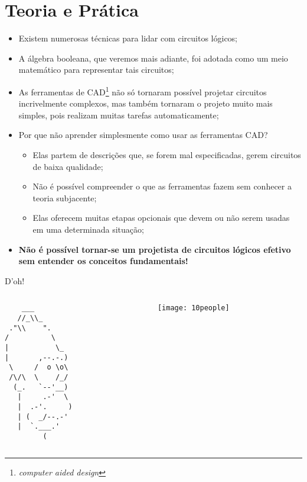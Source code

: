\section{Teoria e Prática}

\begin{frame}{\insertsection}
    \begin{itemize}
        \item Existem numerosas técnicas para lidar com circuitos lógicos; 
        \item A álgebra booleana, que veremos mais adiante, foi adotada como um meio matemático para representar tais circuitos; 
        \item As ferramentas de CAD\footnote{\textit{computer aided design}} não só tornaram possível projetar circuitos incrivelmente complexos, mas também tornaram o projeto muito mais simples, pois realizam muitas tarefas automaticamente;
    \end{itemize}
\end{frame}

\begin{frame}{\insertsection}
    \begin{itemize}
        \item Por que não aprender simplesmente como usar as ferramentas CAD?
        \begin{itemize}
            \item Elas partem de descrições que, se forem mal especificadas, gerem circuitos de baixa qualidade;
            \item Não é possível compreender o que as ferramentas fazem sem conhecer a teoria subjacente;
            \item Elas oferecem muitas etapas opcionais que devem ou não serem usadas em uma determinada situação;
        \end{itemize}
        \item \textbf{Não é possível tornar-se um projetista de circuitos lógicos efetivo sem entender os conceitos fundamentais!}
    \end{itemize}
\end{frame}


\begin{frame}[fragile]{D'oh!} 
    \begin{columns}
        \begin{column}{0.40\textwidth}
\begin{verbatim}
    ___
   //_\\_
 ."\\    ".
/          \
|           \_
|       ,--.-.)
 \     /  o \o\
 /\/\  \    /_/
  (_.   `--'__)
   |     .-'  \
   |  .-'.     )
   | (  _/--.-'
   |  `.___.'
         (
\end{verbatim}        \end{column}            
        \begin{column}{0.60\textwidth}
            \texttt{[image: 10people]} 
        \end{column}
    \end{columns}
\end{frame}


